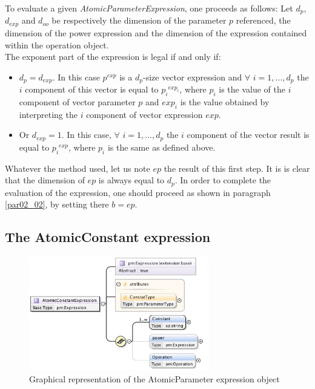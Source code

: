 \documentclass[a4paper,11pt] {ivoa}
\begin{document}
To evaluate a given {\it AtomicParameterExpression}, one proceeds as follows: 
Let $d_p$, $d_{exp}$ and $d_{oo}$ be respectively the dimension of the parameter $p$ referenced, the
dimension of the power expression and the dimension of the expression contained within the operation
object.\\
The exponent part of the expression is legal if and only if:
\begin{itemize}
\item $d_p=d_{exp}$. In this case $p^{exp}$ is a $d_p$-size vector expression and $\forall$
$i=1,...,d_p$ the $i$ component of this vector is equal to ${p_i}^{exp_i}$, where $p_i$ is the value
of the $i$ component of vector parameter $p$ and $exp_i$ is the value obtained by interpreting the
$i$ component of vector expression $exp$.
\item Or $d_{exp}=1$. In this case, $\forall$ $i=1,...,d_p$ the $i$ component of the vector result
is equal to ${p_i}^{exp}$, where $p_i$ is the same as defined above.\\
\end{itemize} 

Whatever the method used, let us note $ep$ the result of this first step. It is is clear that the
dimension of $ep$ is always equal to $d_p$. In order to complete the evaluation of the expression,
one should proceed as shown in paragraph \ref{par02_02}, by setting there $b=ep$.

\subsection{The AtomicConstant expression}\label{par02_03}
\begin{figure}[htbp]
\begin{center}
\includegraphics[width=0.7\textwidth]{pictures/AtomicConstant.jpg} 
\caption{Graphical representation of the AtomicParameter expression object}
\label{Pic-AtomicConstant}
\end{center}
\end{figure}
\end{document}
